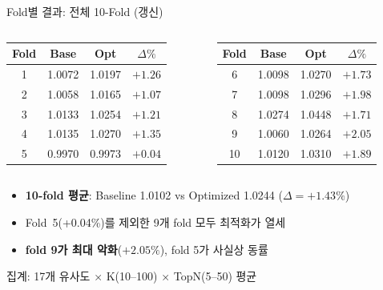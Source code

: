 \documentclass[aspectratio=169,10pt]{beamer}
\begin{document}
\begin{frame}[shrink=5]{Fold별 결과: 전체 10-Fold (갱신)}
	\begin{columns}[T]
		\renewcommand{\arraystretch}{1.2}
		\begin{tabular}{c|c|c|c}
			\toprule
			Fold & Base & Opt & \(\Delta\%\) \\
			\midrule
			1 & 1.0072 & 1.0197 & $+1.26$ \\
			2 & 1.0058 & 1.0165 & $+1.07$ \\
			3 & 1.0133 & 1.0254 & $+1.21$ \\
			4 & 1.0135 & 1.0270 & $+1.35$ \\
			5 & 0.9970 & 0.9973 & $+0.04$ \\
			\bottomrule
		\end{tabular}

		\renewcommand{\arraystretch}{1.2}
		\begin{tabular}{c|c|c|c}
			\toprule
			Fold & Base & Opt & \(\Delta\%\) \\
			\midrule
			6  & 1.0098 & 1.0270 & $+1.73$ \\
			7  & 1.0098 & 1.0296 & $+1.98$ \\
			8  & 1.0274 & 1.0448 & $+1.71$ \\
			9  & 1.0060 & 1.0264 & $+2.05$ \\
			10 & 1.0120 & 1.0310 & $+1.89$ \\
			\bottomrule
		\end{tabular}
	\end{columns}

	\vspace{0.3em}
	\begin{itemize}
		\item \textbf{10-fold 평균}: Baseline 1.0102 vs Optimized 1.0244 ($\Delta=+1.43\%$)
		\item Fold~5(+0.04\%)를 제외한 9개 fold 모두 최적화가 열세
		\item \textbf{fold 9가 최대 악화}($+2.05\%$), fold 5가 사실상 동률
	\end{itemize}
	{\scriptsize 집계: 17개 유사도 × K(10--100) × TopN(5--50) 평균}
\end{frame}
\end{document}
